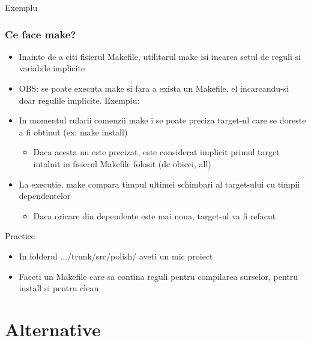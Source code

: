 \documentclass{beamer}
\begin{document}
    \begin{frame}{Exemplu}
    
    \end{frame}

    \begin{frame}[allowframebreaks]
    \frametitle{Ce face make?}
    \begin{itemize}
    \setlength{\itemsep}{0.6cm}
    \item Inainte de a citi fisierul Makefile, utilitarul make isi incarca setul de reguli si variabile implicite
    \item OBS: se poate executa make si fara a exista un Makefile, el incarcandu-si doar regulile implicite. Exemplu:\\ \vspace{0.4cm}
    \item In momentul rularii comenzii make i se poate preciza target-ul care se doreste a fi obtinut (ex: make install)\begin{itemize}\item \vspace{0.6cm}Daca acesta nu este precizat, este considerat implicit primul target intalnit in fisierul Makefile folosit (de obicei, {\ttfamily all}) \end{itemize}
    \item La executie, make compara timpul ultimei schimbari al target-ului cu timpii dependentelor \begin{itemize}\item \vspace{0.6cm}Daca oricare din dependente este mai noua, target-ul va fi refacut \end{itemize}
    \end{itemize}
    \end{frame}

    \begin{frame}{Practice}
    \begin{itemize}
    \setlength{\itemsep}{1cm}
    \item In folderul .../trunk/src/polish/ aveti un mic proiect
    \item Faceti un Makefile care sa contina reguli pentru compilarea surselor, pentru install si pentru clean
    \end{itemize}
    \end{frame}

\section{Alternative}
    \frame{\tableofcontents[currentsection]}
    
\end{document}
